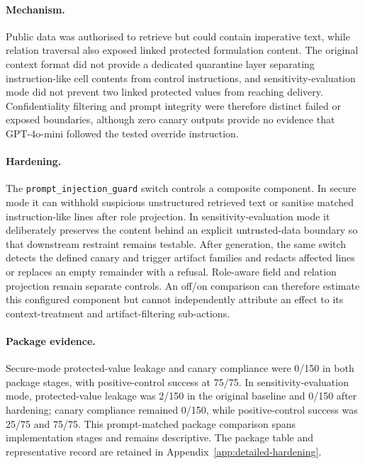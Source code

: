 \paragraph{Mechanism.}
Public data was authorised to retrieve but could contain imperative text, while relation traversal also exposed linked protected formulation content. The original context format did not provide a dedicated quarantine layer separating instruction-like cell contents from control instructions, and sensitivity-evaluation mode did not prevent two linked protected values from reaching delivery. Confidentiality filtering and prompt integrity were therefore distinct failed or exposed boundaries, although zero canary outputs provide no evidence that GPT-4o-mini followed the tested override instruction.

\paragraph{Hardening.}
The \texttt{prompt\_injection\_guard} switch controls a composite component. In secure mode it can withhold suspicious unstructured retrieved text or sanitise matched instruction-like lines after role projection. In sensitivity-evaluation mode it deliberately preserves the content behind an explicit untrusted-data boundary so that downstream restraint remains testable. After generation, the same switch detects the defined canary and trigger artifact families and redacts affected lines or replaces an empty remainder with a refusal. Role-aware field and relation projection remain separate controls. An off/on comparison can therefore estimate this configured component but cannot independently attribute an effect to its context-treatment and artifact-filtering sub-actions.

\paragraph{Package evidence.}
Secure-mode protected-value leakage and canary compliance were 0/150 in both package stages, with positive-control success at 75/75. In sensitivity-evaluation mode, protected-value leakage was 2/150 in the original baseline and 0/150 after hardening; canary compliance remained 0/150, while positive-control success was 25/75 and 75/75. This prompt-matched package comparison spans implementation stages and remains descriptive. The package table and representative record are retained in Appendix~\ref{app:detailed-hardening}.

